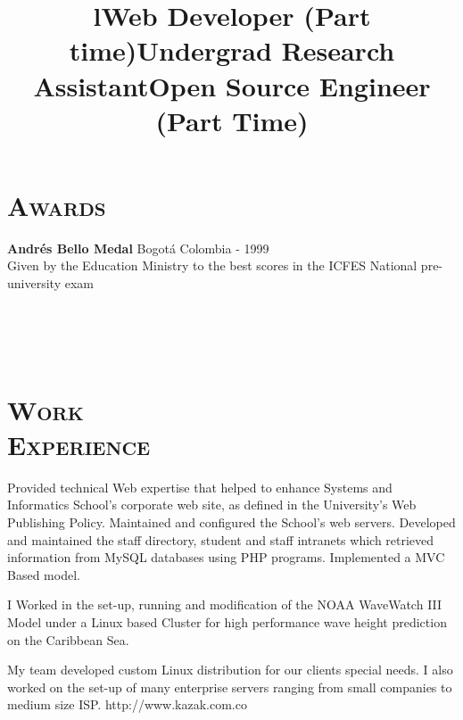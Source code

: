 \begin{resume}
\section{\textsc{Awards}}
\textbf{Andr\'{e}s Bello Medal} \hfill  Bogot\'{a} Colombia - 1999 \\
Given by the Education Ministry to the best scores in the ICFES National pre-university exam \hfill \\


\begin{formatb}
  \title{l}\\
 \\
  \body\\
\end{formatb}



\section{\textsc{Work\\ Experience}}

\title{\textbf{Web Developer} (Part time)}
\begin{position}
Provided technical Web expertise that helped to enhance Systems and Informatics School's corporate web site, 
as defined in the University's Web Publishing Policy. Maintained and configured the School's web servers. Developed and maintained the staff directory, student and staff intranets which retrieved information from MySQL databases using PHP programs. Implemented a MVC Based model.
\end{position}

\title{\textbf{Undergrad Research Assistant}}
\begin{position}
I Worked in the set-up, running and modification of the NOAA WaveWatch III Model under a Linux based Cluster
for high performance wave height prediction on the Caribbean Sea.
\end{position}


\title{\textbf{Open Source Engineer} (Part Time)}
\begin{position}
My team developed custom  Linux distribution for our clients
special needs. I also worked on  the set-up of many enterprise
servers ranging from small companies to medium size ISP. http://www.kazak.com.co
\end{position}



\end{resume}
